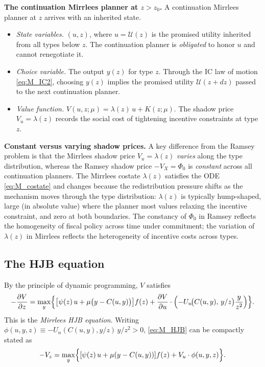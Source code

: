 \documentclass[12pt]{article}
\newcommand{\calU}{\mathcal{U}}
\newcommand{\zlow}{z_{0}}
\begin{document}
\medskip
\noindent\textbf{The continuation Mirrlees planner at $z>\zlow$.}
A continuation Mirrlees planner at $z$ arrives with an inherited
state.
\begin{itemize}
  \item \emph{State variables.}  $(u, z)$, where $u = \calU(z)$ is the
    promised utility inherited from all types below $z$.  The continuation
    planner is \emph{obligated} to honor $u$ and cannot renegotiate it.
  \item \emph{Choice variable.}  The output $y(z)$ for type $z$.  Through the
    IC law of motion \eqref{eq:M_IC2}, choosing $y(z)$ implies the promised
    utility $\calU(z+dz)$ passed to the next continuation planner.
  \item \emph{Value function.}  $V(u, z; \mu) = \lambda(z)\, u + K(z;\mu)$.
    The shadow price $V_u = \lambda(z)$ records the social cost of tightening
    incentive constraints at type $z$.
\end{itemize}

\medskip
\noindent\textbf{Constant versus varying shadow prices.}
A key difference from the Ramsey problem is that the Mirrlees shadow price
$V_u = \lambda(z)$ \emph{varies} along the type distribution, whereas the
Ramsey shadow price $-V_X = \Phi_0$ is \emph{constant} across all
continuation planners.  The Mirrlees costate $\lambda(z)$ satisfies the ODE
\eqref{eq:M_costate} and changes because the redistribution pressure shifts
as the mechanism moves through the type distribution: $\lambda(z)$ is
typically hump-shaped, large (in absolute value) where the planner most
values relaxing the incentive constraint, and zero at both boundaries.  The
constancy of $\Phi_0$ in Ramsey reflects the homogeneity of fiscal policy
across time under commitment; the variation of $\lambda(z)$ in Mirrlees
reflects the heterogeneity of incentive costs across types.

\subsection{The HJB equation}

By the principle of dynamic programming, $V$ satisfies
\begin{equation}\label{eq:M_HJB}
  -\frac{\partial V}{\partial z} =
  \max_{y}\Bigl\{
  \bigl[\psi(z)\, u + \mu\bigl(y - C(u, y)\bigr)\bigr]f(z)
  + \frac{\partial V}{\partial u}\cdot
  \Bigl(-U_n\!\bigl(C(u,y),\,y/z\bigr)\frac{y}{z^2}\Bigr)
  \Bigr\}.
\end{equation}
This is the \emph{Mirrlees HJB equation}.  Writing $\phi(u, y, z) \equiv
-U_n(C(u,y), y/z)\, y/z^2 > 0$, \eqref{eq:M_HJB} can be compactly stated as
\begin{equation}\label{eq:M_HJBcompact}
  -V_z = \max_y \Bigl\{
  [\psi(z)\, u + \mu(y - C(u,y))] f(z)
  + V_u\cdot \phi(u, y, z)
  \Bigr\}.
\end{equation}
\end{document}
